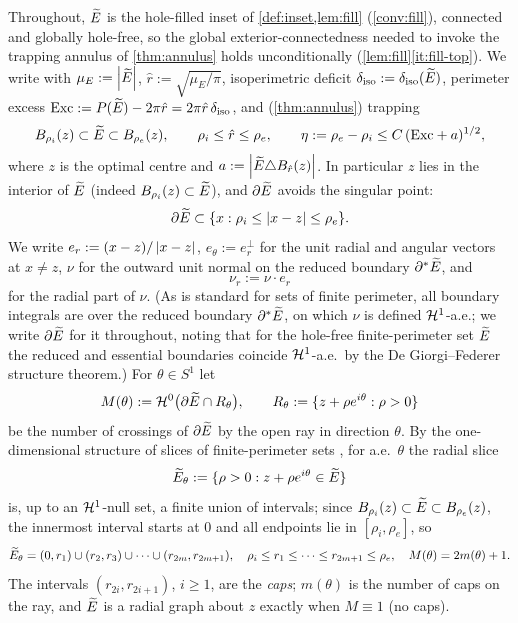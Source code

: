 Throughout, $\widetilde{E}$ is the hole-filled inset of \cref{def:inset,lem:fill}
(\cref{conv:fill}), connected and globally hole-free, so the global
exterior-connectedness needed to invoke the trapping annulus of
\cref{thm:annulus} holds unconditionally (\cref{lem:fill}\ref{it:fill-top}).
We write
with $\mu_E:=\left\lvert\widetilde{E}\right\rvert$, $\hat r:=\sqrt{\mu_E/\pi}$, isoperimetric deficit
$\delta_{\mathrm{iso}}:=\delta_{\mathrm{iso}}(\widetilde{E})$, perimeter excess $\mathrm{Exc}:=P(\widetilde{E})-2\pi\hat r
=2\pi\hat r\,\delta_{\mathrm{iso}}$, and (\cref{thm:annulus}) trapping
\begin{equation}\label{eq:fold-annulus}
   B_{\rho_i}(z)\subset\widetilde{E}\subset B_{\rho_e}(z),\qquad
   \rho_i\le\hat r\le\rho_e,\qquad
   \eta:=\rho_e-\rho_i\le C\,(\mathrm{Exc}+a)^{1/2},
\end{equation}
where $z$ is the optimal centre and $a:=\left\lvert\widetilde{E}\triangle B_{\hat r}(z)\right\rvert$.
In particular $z$ lies in the interior of $\widetilde{E}$ (indeed
$B_{\rho_i}(z)\subset\widetilde{E}$), and $\partial\widetilde{E}$ avoids the singular point:
\begin{equation}\label{eq:fold-away}
   \partial\widetilde{E}\subset\{x:\rho_i\le\left\lvert x-z\right\rvert\le\rho_e\}.
\end{equation}
We write $e_r:=(x-z)/\left\lvert x-z\right\rvert$, $e_\theta:=e_r^\perp$ for the unit radial
and angular vectors at $x\ne z$, $\nu$ for the outward unit normal on the
reduced boundary $\partial^*\widetilde{E}$, and
\[
   \nu_r:=\nu\cdot e_r
\]
for the radial part of $\nu$. (As is standard for sets of finite perimeter,
all boundary integrals are over the reduced boundary $\partial^*\widetilde{E}$, on
which $\nu$ is defined $\mathcal{H}^1$-a.e.; we write $\partial\widetilde{E}$ for it
throughout, noting that for the hole-free finite-perimeter set $\widetilde{E}$ the
reduced and essential boundaries coincide $\mathcal{H}^1$-a.e.\ by the De
Giorgi--Federer structure theorem.) For $\theta\in S^1$ let
\begin{equation}\label{eq:fold-M}
   M(\theta):=\mathcal{H}^0\bigl(\partial\widetilde{E}\cap R_\theta\bigr),\qquad
   R_\theta:=\{z+\rho e^{i\theta}:\rho>0\}
\end{equation}
be the number of crossings of $\partial\widetilde{E}$ by the open ray in direction
$\theta$. By the one-dimensional structure of slices of finite-perimeter
sets \cite[\S2.4, \S3.11]{AFP2000}, for a.e.\ $\theta$ the radial slice
\[
   \widetilde{E}_\theta:=\{\rho>0:z+\rho e^{i\theta}\in\widetilde{E}\}
\]
is, up to an $\mathcal{H}^1$-null set, a finite union of intervals; since
$B_{\rho_i}(z)\subset\widetilde{E}\subset B_{\rho_e}(z)$, the innermost interval
starts at $0$ and all endpoints lie in $[\rho_i,\rho_e]$, so
\begin{equation}\label{eq:fold-slice}
   \widetilde{E}_\theta=(0,r_1)\cup(r_2,r_3)\cup\cdots\cup(r_{2m},r_{2m+1}),
   \quad \rho_i\le r_1\le\cdots\le r_{2m+1}\le\rho_e,
   \quad M(\theta)=2m(\theta)+1.
\end{equation}
The intervals $(r_{2i},r_{2i+1})$, $i\ge1$, are the \emph{caps};
$m(\theta)$ is the number of caps on the ray, and $\widetilde{E}$ is a radial graph
about $z$ exactly when $M\equiv1$ (no caps).

